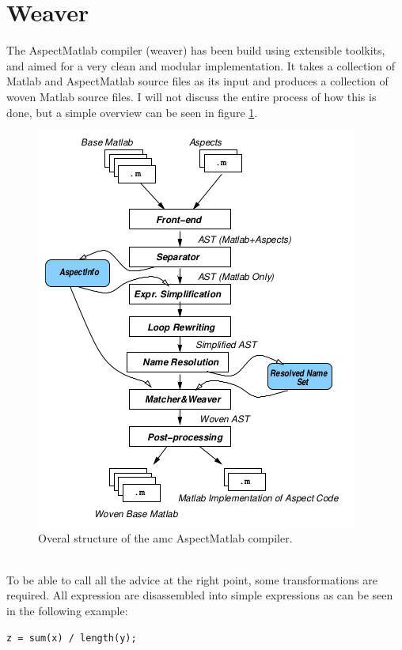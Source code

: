 \documentclass[a4paper]{report}
\begin{document}
\section{Weaver}
The AspectMatlab compiler (weaver) has been build using extensible toolkits, and aimed for a very clean and modular implementation. It takes a collection of Matlab and AspectMatlab source files as its input and produces a collection of woven Matlab source files. I will not discuss the entire process of how this is done, but a simple overview can be seen in figure \ref{fig:Matlab_Weaver}.\\
\begin{figure}
\includegraphics[scale=1]{images/Languages/Matlab_Weaver.png}
\caption{Overal structure of the amc AspectMatlab compiler.}
\label{fig:Matlab_Weaver}
\end{figure}
\\
To be able to call all the advice at the right point, some transformations are required. All expression are disassembled into simple expressions as can be seen in the following example:
\begin{minipage}{0.45\textwidth}
\begin{lstlisting}[caption=Original code.]
z = sum(x) / length(y);
\end{lstlisting}
\end{minipage}\hfill
\end{document}
